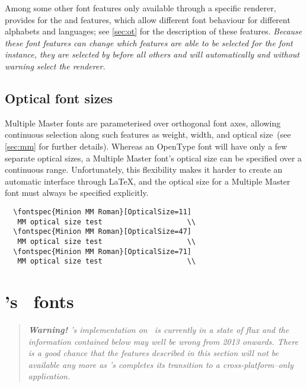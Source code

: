Among some other font features only available through a specific renderer,
 provides for the  and  features, which allow
different font behaviour for different alphabets and languages; see \vref{sec:ot}
for the description of these features. {\em Because these font features can
change which features are able to be selected for the font instance, they are selected
by  before all others and will automatically and without warning
select the  renderer.}


\subsection{Optical font sizes} \label{sec:aat-opticalsize}

Multiple Master fonts are parameterised over
orthogonal font axes, allowing continuous selection along such
features as weight, width, and optical size~(see \vref{sec:mm} for
further details). Whereas an OpenType font will have only a few separate
optical sizes, a Multiple Master font's optical size can be
specified over a continuous range. Unfortunately, this flexibility makes
it harder to create an automatic interface through \LaTeX, and the
optical size for a Multiple Master font must always be specified
explicitly.
\begin{Verbatim}
  \fontspec{Minion MM Roman}[OpticalSize=11]
   MM optical size test                    \\
  \fontspec{Minion MM Roman}[OpticalSize=47]
   MM optical size test                    \\
  \fontspec{Minion MM Roman}[OpticalSize=71]
   MM optical size test                    \\
\end{Verbatim}




\section{\MacOSX's \AAT\ fonts}
\label{sec:aat-features}

\begin{quote}\itshape
\textbf{Warning!}
\XeTeX's implementation on \MacOSX\ is currently in a state of flux and the information contained below may well be wrong from 2013 onwards.
There is a good chance that the features described in this section will not be available any more as \XeTeX's completes its transition to a cross-platform--only application.
\end{quote}


